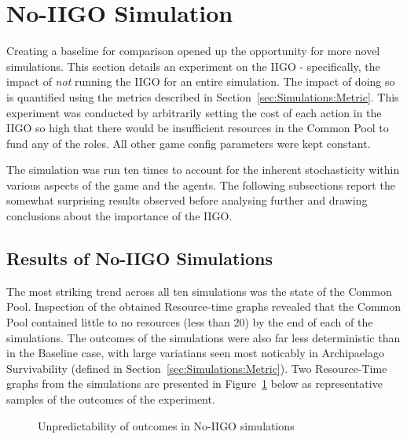 \section{No-IIGO Simulation}
\label{sec:ResultsAndEval:no-iigo}

Creating a baseline for comparison opened up the opportunity for more novel simulations. This section details an experiment on the IIGO - specifically, the impact of \emph{not} running the IIGO for an entire simulation. The impact of doing so is quantified using the metrics described in Section~\ref{sec:Simulations:Metric}.
This experiment was conducted by arbitrarily setting the cost of each action in the IIGO so high that there would be insufficient resources in the Common Pool to fund any of the roles. All other game config parameters were kept constant. 

The simulation was run ten times to account for the inherent stochasticity within various aspects of the game and the agents. The following subsections report the somewhat surprising results observed before analysing further and drawing conclusions about the importance of the IIGO.

\subsection{Results of No-IIGO Simulations}
\label{subsec:ResultsAndEval:no-iigo:results}

The most striking trend across all ten simulations was the state of the Common Pool. Inspection of the obtained Resource-time graphs revealed that the Common Pool contained little to no resources (less than 20) by the end of each of the simulations. The outcomes of the simulations were also far less deterministic than in the Baseline case, with large variatians seen most noticably in Archipaelago Survivability (defined in Section~\ref{sec:Simulations:Metric}).
Two Resource-Time graphs from the simulations are presented in Figure~\ref{fig:ResultsAndEval:no_iigo_unpredictable} below as representative samples of the outcomes of the experiment.


\begin{figure}[h]
    \centering
    \caption{Unpredictability of outcomes in No-IIGO simulations}
    \label{fig:ResultsAndEval:no_iigo_unpredictable}
\end{figure}

